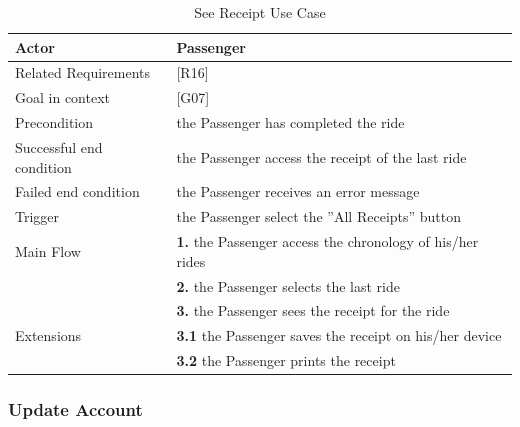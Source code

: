 \begin{table}[htbp]
\begin{center}
\begin{tabular}[t]{p{}p{}}

\hline
Actor & Passenger \\
\hline
Related Requirements & [R16] \\
\hline
Goal in context & [G07] \\
\hline
Precondition & the Passenger has completed the ride \\
\hline
Successful end condition & the Passenger access the receipt of the last ride \\
\hline
Failed end condition & the Passenger receives an error message  \\
\hline
Trigger & the Passenger select the ''All Receipts'' button \\
\hline
Main Flow & \textbf{1.} the Passenger access the chronology of his/her rides \\
& \textbf{2.} the Passenger selects the last ride \\
& \textbf{3.} the Passenger sees the receipt for the ride \\
\hline
Extensions & \textbf{3.1} the Passenger saves the receipt on his/her device \\
& \textbf{3.2} the Passenger prints the receipt \\
\hline

\end{tabular}
\end{center}
\caption{See Receipt Use Case}
\end{table}
\clearpage

\subsubsection{Update Account}

